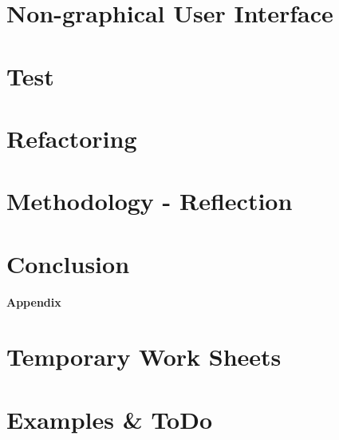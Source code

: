 \chapter{Non-graphical User Interface}
\label{chap:tactileInterface}


\chapter{Test}
\label{chap:test}


\chapter{Refactoring}
\label{chap:refactoring}


\chapter{Methodology - Reflection}
\label{chap:reflectionMethodology}


\chapter{Conclusion}
\label{chap:conclusion}



%

\appendix	%

\clearforchapter
\begin{vplace}[0.7]
\begin{center}
\Huge \textbf{Appendix}
\end{center}
\end{vplace}



\chapter{Temporary Work Sheets}
\label{chap:temp}









\chapter{Examples \& ToDo}

\clearpage
\listoftodos
